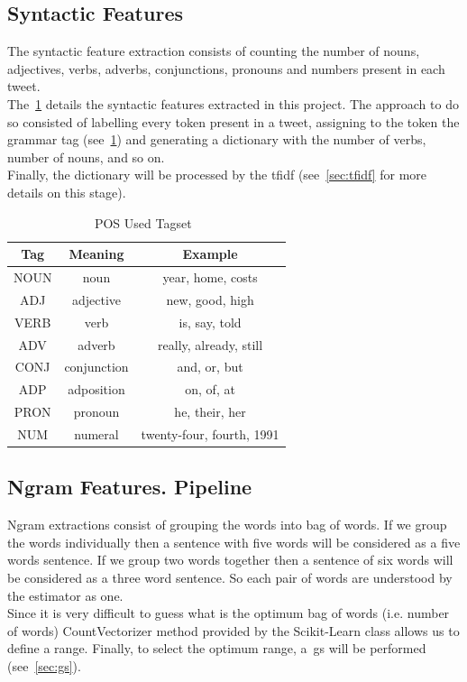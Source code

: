 \subsection{Syntactic Features}
The syntactic feature extraction consists of counting the number of nouns, adjectives, verbs, adverbs, conjunctions, pronouns and numbers present in each tweet.\\
The~\cref{tab:pos} details the syntactic features extracted in this project. The approach to do so consisted of labelling every token present in a tweet, assigning to the token the grammar tag (see~\cref{tab:pos}) and generating a dictionary with the number of verbs, number of nouns, and so on.\\
Finally, the dictionary will be processed by the \ac{tfidf} (see~\cref{sec:tfidf} for more details on this stage).
\begin{table}[h!]
	\centering
	\begin{tabular}{||c c c||} 
		\hline
		\textbf{Tag} & \textbf{Meaning} & \textbf{Example} \\ [0.5ex] 
		\hline\hline
		NOUN & noun & year, home, costs \\ 
		ADJ & adjective & new, good, high \\
		VERB & verb & is, say, told \\
		ADV & adverb & really, already, still \\
		CONJ & conjunction & and, or, but \\
		ADP & adposition & on, of, at \\
		PRON & pronoun & he, their, her \\
		NUM & numeral & twenty-four, fourth, 1991 \\
		[1ex] 
		\hline
	\end{tabular}
	\caption{POS Used Tagset~\cite{pos}}
	\label{tab:pos}
\end{table}
\subsection{Ngram Features. Pipeline}
Ngram extractions consist of grouping the words into bag of words. If we group the words individually then a sentence with five words will be considered as a five words sentence. If we group two words together then a sentence of six words will be considered as a three word sentence. So each pair of words are understood by the estimator as one.\\
Since it is very difficult to guess what is the optimum bag of words (i.e. number of words) CountVectorizer method provided by the Scikit-Learn class allows us to define a range. Finally, to select the optimum range, a~\ac{gs} will be performed (see~\cref{sec:gs}).
